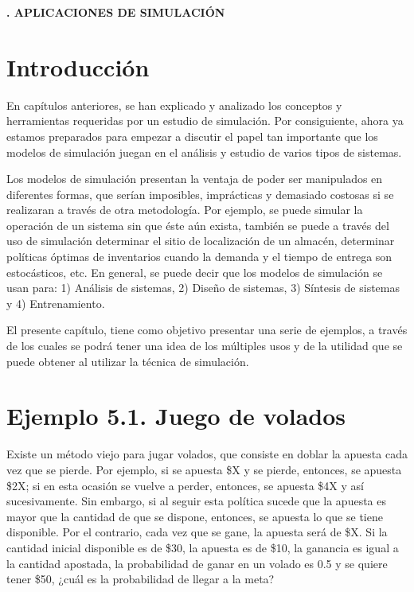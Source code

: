 \documentclass[11pt,letterpaper]{report}
\begin{document}
\begin{center}
{\LARGE\bfseries\linespread{1.3}. APLICACIONES DE SIMULACIÓN\par}
\end{center}
\vspace{0.5cm}

\setcounter{chapter}{5}
\setcounter{page}{67}

\section*{Introducción}

En capítulos anteriores, se han explicado y analizado los conceptos y
herramientas requeridas por un estudio de simulación. Por consiguiente,
ahora ya estamos preparados para empezar a discutir el papel tan
importante que los modelos de simulación juegan en el análisis y estudio
de varios tipos de sistemas.

Los modelos de simulación presentan la ventaja de poder ser manipulados
en diferentes formas, que serían imposibles, imprácticas y demasiado
costosas si se realizaran a través de otra metodología. Por ejemplo, se
puede simular la operación de un sistema sin que éste aún exista, también
se puede a través del uso de simulación determinar el sitio de
localización de un almacén, determinar políticas óptimas de inventarios
cuando la demanda y el tiempo de entrega son estocásticos, etc. En
general, se puede decir que los modelos de simulación se usan para: 1)
Análisis de sistemas, 2) Diseño de sistemas, 3) Síntesis de sistemas y 4)
Entrenamiento.

El presente capítulo, tiene como objetivo presentar una serie de
ejemplos, a través de los cuales se podrá tener una idea de los múltiples
usos y de la utilidad que se puede obtener al utilizar la técnica de
simulación.

\section*{Ejemplo 5.1. Juego de volados}

Existe un método viejo para jugar volados, que consiste en doblar la
apuesta cada vez que se pierde. Por ejemplo, si se apuesta \$X y se
pierde, entonces, se apuesta \$2X; si en esta ocasión se vuelve a perder,
entonces, se apuesta \$4X y así sucesivamente. Sin embargo, si al seguir
esta política sucede que la apuesta es mayor que la cantidad de que se
dispone, entonces, se apuesta lo que se tiene disponible. Por el
contrario, cada vez que se gane, la apuesta será de \$X. Si la cantidad
inicial disponible es de \$30, la apuesta es de \$10, la ganancia es igual
a la cantidad apostada, la probabilidad de ganar en un volado es 0.5 y se
quiere tener \$50, ¿cuál es la probabilidad de llegar a la meta?
\end{document}
